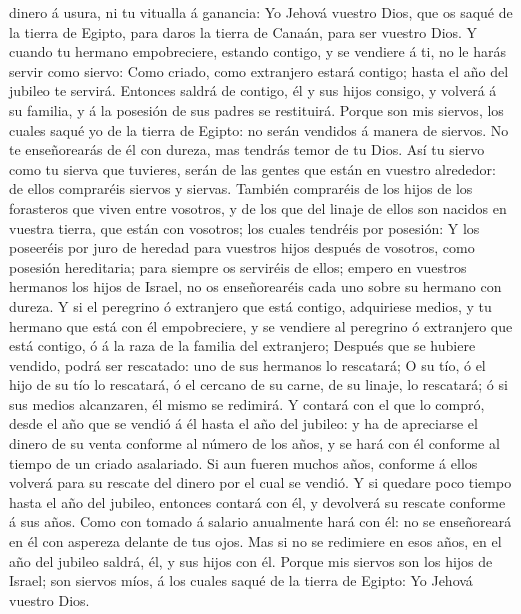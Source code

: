 dinero á usura, ni tu vitualla á ganancia:  Yo Jehová
vuestro Dios, que os saqué de la tierra de Egipto, para daros la tierra
de Canaán, para ser vuestro Dios.  Y cuando tu hermano
empobreciere, estando contigo, y se vendiere á ti, no le harás servir
como siervo:  Como criado, como extranjero estará contigo;
hasta el año del jubileo te servirá.  Entonces saldrá de
contigo, él y sus hijos consigo, y volverá á su familia, y á la posesión
de sus padres se restituirá.  Porque son mis siervos, los
cuales saqué yo de la tierra de Egipto: no serán vendidos á manera de
siervos.  No te enseñorearás de él con dureza, mas tendrás
temor de tu Dios.  Así tu siervo como tu sierva que
tuvieres, serán de las gentes que están en vuestro alrededor: de ellos
compraréis siervos y siervas.  También compraréis de los
hijos de los forasteros que viven entre vosotros, y de los que del
linaje de ellos son nacidos en vuestra tierra, que están con vosotros;
los cuales tendréis por posesión:  Y los poseeréis por juro
de heredad para vuestros hijos después de vosotros, como posesión
hereditaria; para siempre os serviréis de ellos; empero en vuestros
hermanos los hijos de Israel, no os enseñorearéis cada uno sobre su
hermano con dureza.  Y si el peregrino ó extranjero que
está contigo, adquiriese medios, y tu hermano que está con él
empobreciere, y se vendiere al peregrino ó extranjero que está contigo,
ó á la raza de la familia del extranjero;  Después que se
hubiere vendido, podrá ser rescatado: uno de sus hermanos lo rescatará;
 O su tío, ó el hijo de su tío lo rescatará, ó el cercano
de su carne, de su linaje, lo rescatará; ó si sus medios alcanzaren, él
mismo se redimirá.  Y contará con el que lo compró, desde
el año que se vendió á él hasta el año del jubileo: y ha de apreciarse
el dinero de su venta conforme al número de los años, y se hará con él
conforme al tiempo de un criado asalariado.  Si aun fueren
muchos años, conforme á ellos volverá para su rescate del dinero por el
cual se vendió.  Y si quedare poco tiempo hasta el año del
jubileo, entonces contará con él, y devolverá su rescate conforme á sus
años.  Como con tomado á salario anualmente hará con él: no
se enseñoreará en él con aspereza delante de tus ojos.  Mas
si no se redimiere en esos años, en el año del jubileo saldrá, él, y sus
hijos con él.  Porque mis siervos son los hijos de Israel;
son siervos míos, á los cuales saqué de la tierra de Egipto: Yo Jehová
vuestro Dios.

